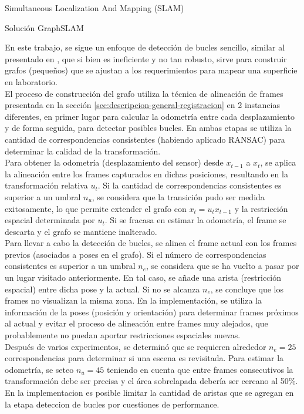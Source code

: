 \begin{subsection}{ Simultaneous Localization And Mapping (SLAM) }
\begin{subsection}{Solución GraphSLAM}
\begin{subsection}
En este trabajo, se sigue un enfoque de detección de bucles sencillo, similar al presentado en \cite{henry2010rgb}, que si bien es ineficiente y no tan robusto, sirve para construir grafos (pequeños) que se ajustan a los requerimientos para mapear una superficie en laboratorio. \\
El proceso de construcción del grafo utiliza la técnica de alineación de frames presentada en la sección \ref{sec:descripcion-general-registracion} en 2 instancias diferentes, en primer lugar para calcular la odometría entre cada desplazamiento y de forma seguida, para detectar posibles bucles. En ambas etapas se utiliza la cantidad de correspondencias consistentes (habiendo aplicado RANSAC) para determinar la calidad de la transformación. \\
Para obtener la odometría (desplazamiento del sensor) desde \textbf{$x_{t-1}$} a \textbf{$x_{t}$}, se aplica la alineación entre los frames capturados en dichas posiciones, resultando en la transformación relativa \textbf{$u_{t}$}. Si la cantidad de correspondencias consistentes es superior a un umbral $n_{u}$, se considera que la transición pudo ser medida exitosamente, lo que permite extender el grafo con \textbf{$ x_{t} = u_{t} x_{t-1} $} y la restricción espacial determinada por \textbf{$u_{t}$}. Si se fracasa en estimar la odometría, el frame se descarta y el grafo se mantiene inalterado. \\
Para llevar a cabo la detección de bucles, se alinea el frame actual con los frames previos (asociados a poses en el grafo). Si el número de correspondencias consistentes es superior a un umbral $n_{e}$, se considera que se ha vuelto a pasar por un lugar visitado anteriormente. En tal caso, se añade una arista (restricción espacial) entre dicha pose y la actual. Si no se alcanza $n_{e}$, se concluye que los frames no visualizan la misma zona. En la implementación, se utiliza la información de la poses (posición y orientación) para determinar frames próximos al actual y evitar el proceso de alineación entre frames muy alejados, que probablemente no puedan aportar restricciones espaciales nuevas. \\
Después de varios experimentos, se determinó que se requieren alrededor $n_{e} = 25$ correspondencias para determinar si una escena es revisitada. Para estimar la odometría, se seteo $ n_{u} = 45 $ teniendo en cuenta que entre frames consecutivos la transformación debe ser precisa y el área sobrelapada debería ser cercano al 50\%. \\
En la implementacion es posible limitar la cantidad de aristas que se agregan en la etapa deteccion de bucles por cuestiones de performance.
\end{subsection}


\end{subsection}
\end{subsection}
